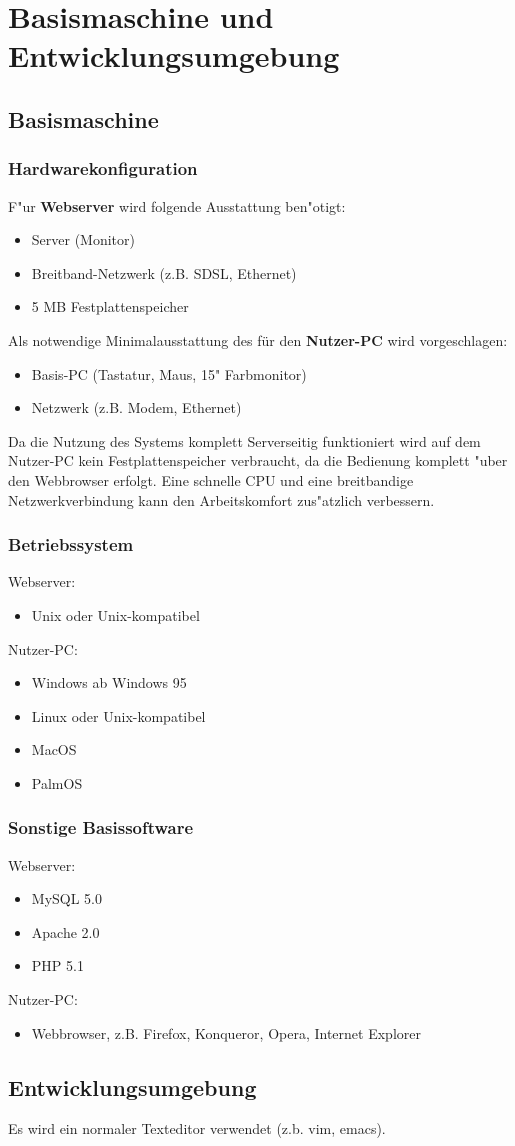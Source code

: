 \chapter{Basismaschine und Entwicklungsumgebung}
\section{Basismaschine}
\subsection{Hardwarekonfiguration}
F"ur {\bf Webserver} wird folgende Ausstattung ben"otigt:
\begin{itemize}
 \item Server (Monitor)
 \item Breitband-Netzwerk (z.B. SDSL, Ethernet)
 \item 5 MB Festplattenspeicher
\end{itemize}
Als notwendige Minimalausstattung des für den {\bf Nutzer-PC} wird vorgeschlagen:
\begin{itemize}
 \item Basis-PC (Tastatur, Maus, 15" Farbmonitor)
 \item Netzwerk (z.B. Modem, Ethernet)
\end{itemize}
Da die Nutzung des Systems komplett Serverseitig funktioniert wird auf dem Nutzer-PC kein Festplattenspeicher verbraucht, da die
Bedienung komplett "uber den Webbrowser erfolgt. Eine schnelle CPU und eine breitbandige Netzwerkverbindung
kann den Arbeitskomfort zus"atzlich verbessern.


\subsection{Betriebssystem}
Webserver:
\begin{itemize}
\item Unix oder Unix-kompatibel
\end{itemize}
Nutzer-PC:
\begin{itemize}
\item Windows ab Windows 95
\item Linux oder Unix-kompatibel
\item MacOS
\item PalmOS
\end{itemize}

\subsection{Sonstige Basissoftware}
Webserver:
\begin{itemize}
\item MySQL 5.0
\item Apache 2.0
\item PHP 5.1
\end{itemize}
Nutzer-PC:
\begin{itemize}
\item Webbrowser, z.B. Firefox, Konqueror, Opera, Internet Explorer
\end{itemize}


\section{Entwicklungsumgebung}
Es wird ein normaler Texteditor verwendet (z.b. vim, emacs).
